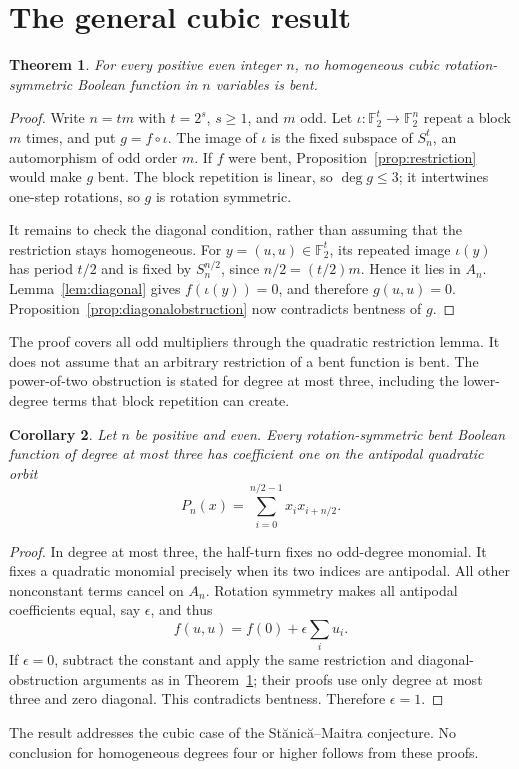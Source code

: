 \documentclass[11pt,a4paper]{article}
\newtheorem{theorem}{Theorem}[section]
\newtheorem{corollary}[theorem]{Corollary}
\newcommand{\F}{\mathbb F_2}
\begin{document}
\section{The general cubic result}
\begin{theorem}\label{thm:general}
For every positive even integer $n$, no homogeneous cubic rotation-symmetric Boolean function in $n$ variables is bent.
\end{theorem}
\begin{proof}
Write $n=tm$ with $t=2^s$, $s\ge1$, and $m$ odd. Let $\iota:\F^t\to\F^n$ repeat a block $m$ times, and put $g=f\circ\iota$. The image of $\iota$ is the fixed subspace of $S_n^t$, an automorphism of odd order $m$. If $f$ were bent, Proposition~\ref{prop:restriction} would make $g$ bent. The block repetition is linear, so $\deg g\le3$; it intertwines one-step rotations, so $g$ is rotation symmetric.

It remains to check the diagonal condition, rather than assuming that the restriction stays homogeneous. For $y=(u,u)\in\F^t$, its repeated image $\iota(y)$ has period $t/2$ and is fixed by $S_n^{n/2}$, since $n/2=(t/2)m$. Hence it lies in $A_n$. Lemma~\ref{lem:diagonal} gives $f(\iota(y))=0$, and therefore $g(u,u)=0$. Proposition~\ref{prop:diagonalobstruction} now contradicts bentness of $g$.
\end{proof}
The proof covers all odd multipliers through the quadratic restriction lemma. It does not assume that an arbitrary restriction of a bent function is bent. The power-of-two obstruction is stated for degree at most three, including the lower-degree terms that block repetition can create.

\begin{corollary}\label{cor:antipodal}
Let $n$ be positive and even. Every rotation-symmetric bent Boolean function of degree at most three has coefficient one on the antipodal quadratic orbit
\[
 P_n(x)=\sum_{i=0}^{n/2-1}x_ix_{i+n/2}.
\]
\end{corollary}
\begin{proof}
In degree at most three, the half-turn fixes no odd-degree monomial. It fixes a quadratic monomial precisely when its two indices are antipodal. All other nonconstant terms cancel on $A_n$. Rotation symmetry makes all antipodal coefficients equal, say $\epsilon$, and thus
\[
 f(u,u)=f(0)+\epsilon\sum_i u_i.
\]
If $\epsilon=0$, subtract the constant and apply the same restriction and diagonal-obstruction arguments as in Theorem~\ref{thm:general}; their proofs use only degree at most three and zero diagonal. This contradicts bentness. Therefore $\epsilon=1$.
\end{proof}
The result addresses the cubic case of the St\u{a}nic\u{a}--Maitra conjecture. No conclusion for homogeneous degrees four or higher follows from these proofs.
\end{document}
